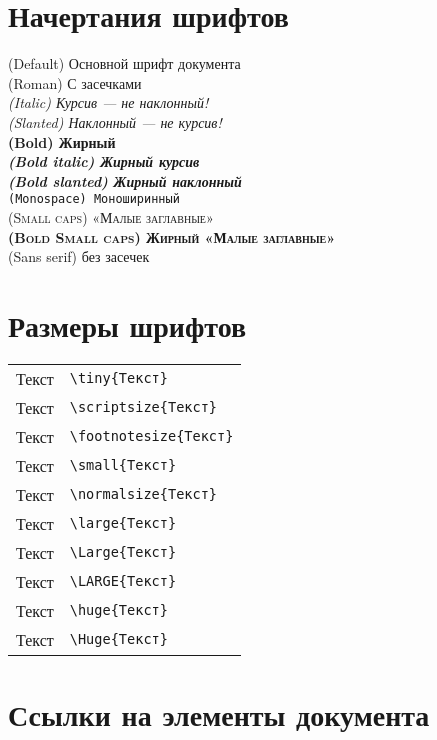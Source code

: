 \section{Начертания шрифтов}
\noindent%
\textnormal{(Default) Основной шрифт документа}\\
\textrm{(Roman) С засечками}\\
\textit{(Italic) Курсив — не наклонный!}\\
\textsl{(Slanted) Наклонный — не курсив!}\\
\textbf{(Bold) Жирный}\\
\textbf{\textit{(Bold italic) Жирный курсив}}\\
\textbf{\textsl{(Bold slanted) Жирный наклонный}}\\
\texttt{(Monospace) Моноширинный}\\
\textsc{(Small caps) «Малые заглавные»}\\
\textbf{\textsc{(Bold Small caps) Жирный «Малые заглавные»}}\\
\textsf{(Sans serif) без засечек}

\section{Размеры шрифтов}\label{sec:font_size}

\begin{tabular}{cl}
	\hline
\tiny{Текст}	& \verb*|\tiny{Текст}| \\
\scriptsize{Текст}& \verb*|\scriptsize{Текст}| \\
\footnotesize{Текст}& \verb*|\footnotesize{Текст}| \\
\small{Текст}& \verb*|\small{Текст}| \\
\normalsize{Текст}& \verb*|\normalsize{Текст}| \\
\large{Текст}& \verb*|\large{Текст}| \\
\Large{Текст}& \verb*|\Large{Текст}| \\
\LARGE{Текст}& \verb*|\LARGE{Текст}| \\
\huge{Текст}& \verb*|\huge{Текст}| \\
\Huge{Текст}& \verb*|\Huge{Текст}| \\
\hline
\end{tabular}


\section{Ссылки на элементы документа}



